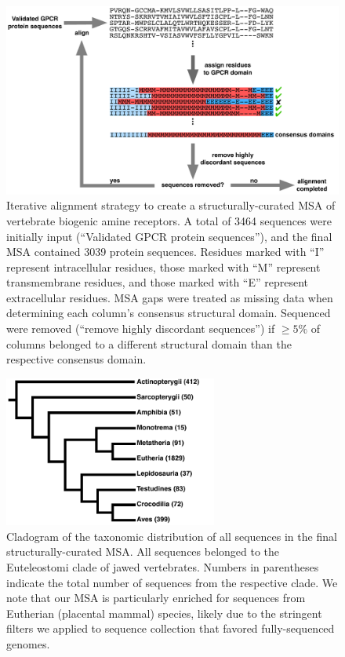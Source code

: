 \documentclass[fleqn,10pt]{wlpeerj}
\begin{document}
\newpage

\begin{figure}[htbp]
	\centerline{\includegraphics[width=18cm]{figures/alignment_flowchart.pdf}}
	\caption{\label{flowchart} Iterative alignment strategy to create a structurally-curated MSA of vertebrate biogenic amine receptors. A total of 3464 sequences were initially input (``Validated GPCR protein sequences''), and the final MSA contained 3039 protein sequences. Residues marked with ``I'' represent intracellular residues, those marked with ``M'' represent transmembrane residues, and those marked with ``E'' represent extracellular residues. MSA gaps were treated as missing data when determining each column's consensus structural domain. Sequenced were removed (``remove highly discordant sequences'') if $\geq 5\%$ of columns belonged to a different structural domain than the respective consensus domain.}
\end{figure}



\begin{figure}[htbp]
	\centerline{\includegraphics[width=7cm]{figures/taxonomic_distribution.pdf}}
	\caption{\label{taxa_dist} Cladogram of the taxonomic distribution of all sequences in the final structurally-curated MSA. All sequences belonged to the Euteleostomi clade of jawed vertebrates. Numbers in parentheses indicate the total number of sequences from the respective clade. We note that our MSA is particularly enriched for sequences from Eutherian (placental mammal) species, likely due to the stringent filters we applied to sequence collection that favored fully-sequenced genomes.}
\end{figure}
\end{document}

